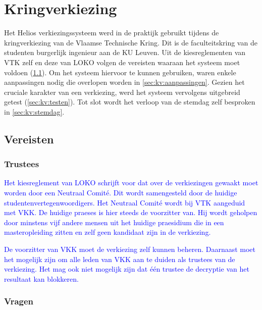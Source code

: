 % 
%

\chapter{Kringverkiezing}
\label{chap:kringverkiezing}

Het Helios verkiezingssysteem werd in de praktijk gebruikt tijdens de kringverkiezing van de Vlaamse Technische Kring. Dit is de faculteitskring van de studenten burgerlijk ingenieur aan de KU Leuven. Uit de kiesreglementen van VTK zelf en deze van LOKO volgen de vereisten waaraan het systeem moet voldoen (\ref{sec:kv:vereisten}). Om het systeem hiervoor te kunnen gebruiken, waren enkele aanpassingen nodig die overlopen worden in \ref{sec:kv:aanpassingen}. Gezien het cruciale karakter van een verkiezing, werd het systeem vervolgens uitgebreid getest (\ref{sec:kv:testen}). Tot slot wordt het verloop van de stemdag zelf besproken in \ref{sec:kv:stemdag}.


\section{Vereisten~\cite{loko_kiesreglement_verkiezingen}\cite{vtk_verkiezingsreglement}}
\label{sec:kv:vereisten}


\subsection{Trustees}

\textcolor{blue}{Het kiesreglement van LOKO schrijft voor dat over de verkiezingen gewaakt moet worden door een Neutraal Comit\'e. Dit wordt samengesteld door de huidige studentenvertegenwoordigers. Het Neutraal Comit\'e wordt bij VTK aangeduid met VKK. De huidige praeses is hier steeds de voorzitter van. Hij wordt geholpen door minstens vijf andere mensen uit het huidige praesidium die in een masteropleiding zitten en zelf geen kandidaat zijn in de verkiezing.}

\npar \textcolor{blue}{De voorzitter van VKK moet de verkiezing zelf kunnen beheren. Daarnaast moet het mogelijk zijn om alle leden van VKK aan te duiden als trustees van de verkiezing. Het mag ook niet mogelijk zijn dat \'e\'en trustee de decryptie van het resultaat kan blokkeren.}

\subsection{Vragen}

